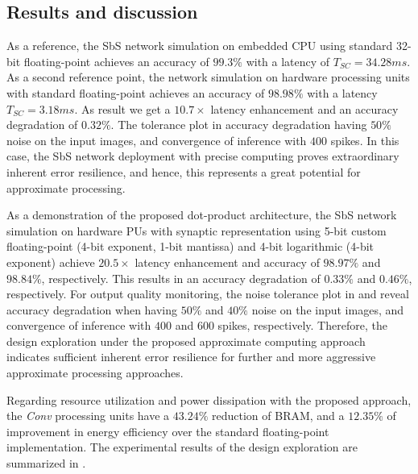 \subsection{Results and discussion}
As a reference, the SbS network simulation on embedded CPU using standard 32-bit floating-point achieves an accuracy of $99.3\%$ with a latency of $T_{SC} = 34.28ms$. As a second reference point, the network simulation on hardware processing units with standard floating-point achieves an accuracy of $98.98\%$ with a latency $T_{SC}=3.18ms$. As result we get a $10.7\times$ latency enhancement and an accuracy degradation of $0.32\%$. The tolerance plot in   accuracy degradation having $50\%$ noise on the input images, and convergence of inference with $400$ spikes. In this case, the SbS network deployment with precise computing proves extraordinary inherent error resilience, and hence, this represents a great potential for approximate processing.

As a demonstration of the proposed dot-product architecture, the SbS network simulation on hardware PUs with synaptic representation using 5-bit custom floating-point (4-bit exponent, 1-bit mantissa) and 4-bit logarithmic (4-bit exponent) achieve $20.5\times$ latency enhancement and accuracy of $98.97\%$ and $98.84\%$, respectively. This results in an accuracy degradation of $0.33\%$ and $0.46\%$, respectively. For output quality monitoring, the noise tolerance plot in  and  reveal accuracy degradation when having $50\%$ and $40\%$ noise on the input images, and convergence of inference with $400$ and $600$ spikes, respectively. Therefore, the design exploration under the proposed approximate computing approach indicates sufficient inherent error resilience for further and more aggressive approximate processing approaches.

Regarding resource utilization and power dissipation with the proposed approach, the \emph{Conv} processing units have a $43.24\%$ reduction of BRAM, and a $12.35\%$ of improvement in energy efficiency over the standard floating-point implementation.  The experimental results of the design exploration are summarized in .

